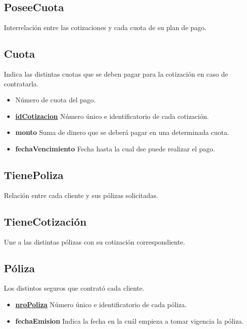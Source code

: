 \documentclass[a4paper,11pt]{article}
\begin{document}
\subsection{PoseeCuota}

Interrelación entre las cotizaciones y cada cuota de su plan de pago.

\subsection{Cuota}

Indica las distintas cuotas que se deben pagar para la cotización en caso de contratarla.

\begin{itemize}

  \item \textbf{} Número de cuota del pago.
    
  \item \textbf{\uline{idCotizacion}} Número único e identificatorio de cada cotización.
  
  \item \textbf{monto} Suma de dinero que se deberá pagar en una determinada cuota.

  \item \textbf{fechaVencimiento} Fecha hasta la cual dse puede realizar el pago.

\end{itemize}

\subsection{TienePoliza}

Relación entre cada cliente y sus pólizas solicitadas.

\subsection{TieneCotización}

Une a las distintas pólizas con su cotización correspondiente.

\subsection{Póliza}

Los distintos seguros que contrató cada cliente.

\begin{itemize}
   
  \item \textbf{\uline{nroPoliza}} Número único e identificatorio de cada póliza.
  	
  \item \textbf{fechaEmision} Indica la fecha en la cuál empieza a tomar vigencia la póliza.
      
\end{itemize}
\end{document}
